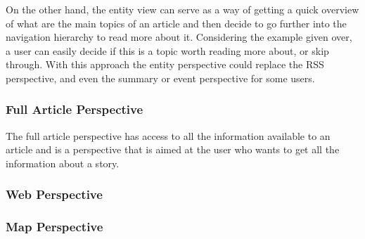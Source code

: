 On the other hand, the entity view can serve as a way of getting a quick overview of what are the main topics of an article and then decide to go further into the navigation hierarchy to read more about it. Considering the example given over, a user can easily decide if this is a topic worth reading more about, or skip through. With this approach the entity perspective could replace the RSS perspective, and even the summary or event perspective for some users.



\subsubsection{Full Article Perspective}
The full article perspective has access to all the information available to an article and is a perspective that is aimed at the user who wants to get all the information about a story. 

\subsubsection{Web Perspective}


\subsubsection{Map Perspective}